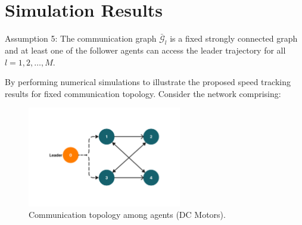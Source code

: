 \documentclass[journal,onecolumn]{IEEEtran}
\begin{document}

\section{Simulation Results}



Assumption 5: The communication graph \(\bar{\mathcal{G}}_l\) is a fixed strongly connected graph and at least one of the follower agents can access the leader trajectory for all \(l = 1,2,\dots,M\).

By performing numerical simulations to illustrate the proposed speed tracking results for fixed communication topology. Consider the network comprising:

\begin{figure}[h!]
    \centering
    \includegraphics[width=0.6\textwidth]{communication.png}
    \caption{Communication topology among agents (DC Motors).}
    \label{fig:communication1} %
\end{figure}
\end{document}
